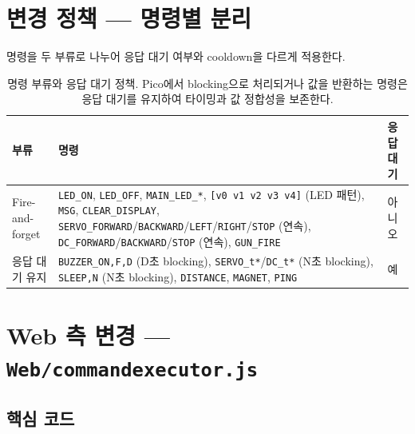 \documentclass[11pt, oneside]{article}
\begin{document}
\section{변경 정책 — 명령별 분리}

명령을 두 부류로 나누어 응답 대기 여부와 cooldown을 다르게 적용한다.

\begin{table}[h]
\centering
\small
\begin{tabularx}{\linewidth}{@{}lXl@{}}
\toprule
부류 & 명령 & 응답 대기 \\
\midrule
Fire-and-forget & \texttt{LED\_ON}, \texttt{LED\_OFF}, \texttt{MAIN\_LED\_*}, \texttt{[v0 v1 v2 v3 v4]} (LED 패턴),
\texttt{MSG}, \texttt{CLEAR\_DISPLAY}, \texttt{SERVO\_FORWARD}/\texttt{BACKWARD}/\texttt{LEFT}/\texttt{RIGHT}/\texttt{STOP} (연속),
\texttt{DC\_FORWARD}/\texttt{BACKWARD}/\texttt{STOP} (연속), \texttt{GUN\_FIRE} & 아니오 \\
\midrule
응답 대기 유지 & \texttt{BUZZER\_ON,F,D} (D초 blocking), \texttt{SERVO\_t*}/\texttt{DC\_t*} (N초 blocking),
\texttt{SLEEP,N} (N초 blocking), \texttt{DISTANCE}, \texttt{MAGNET}, \texttt{PING} & 예 \\
\bottomrule
\end{tabularx}
\caption{명령 부류와 응답 대기 정책. Pico에서 blocking으로 처리되거나
값을 반환하는 명령은 응답 대기를 유지하여 타이밍과 값 정합성을 보존한다.}
\end{table}

\section{Web 측 변경 — \texttt{Web/commandexecutor.js}}

\subsection{핵심 코드}
\end{document}
